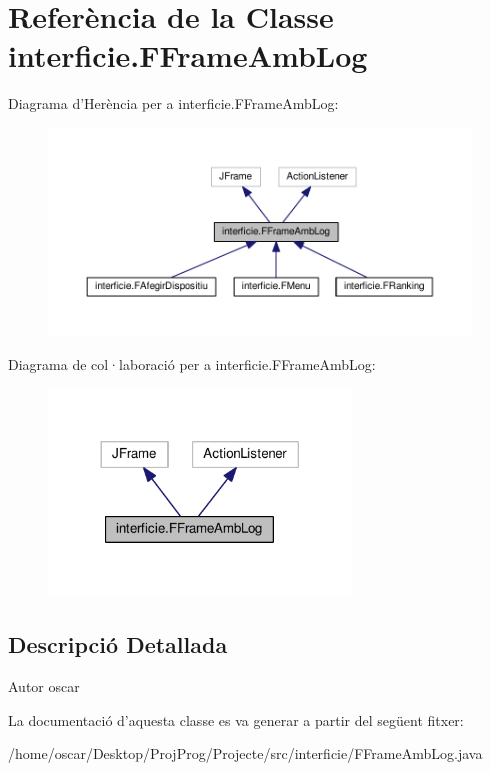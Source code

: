 \hypertarget{classinterficie_1_1_f_frame_amb_log}{\section{Referència de la Classe interficie.\+F\+Frame\+Amb\+Log}
\label{classinterficie_1_1_f_frame_amb_log}
}


Diagrama d'Herència per a interficie.\+F\+Frame\+Amb\+Log\+:\nopagebreak
\begin{figure}[H]
\begin{center}
\leavevmode
\includegraphics[width=350pt]{classinterficie_1_1_f_frame_amb_log__inherit__graph}
\end{center}
\end{figure}


Diagrama de col·laboració per a interficie.\+F\+Frame\+Amb\+Log\+:\nopagebreak
\begin{figure}[H]
\begin{center}
\leavevmode
\includegraphics[width=228pt]{classinterficie_1_1_f_frame_amb_log__coll__graph}
\end{center}
\end{figure}


\subsection{Descripció Detallada}
\begin{DoxyAuthor}{Autor}
oscar 
\end{DoxyAuthor}


La documentació d'aquesta classe es va generar a partir del següent fitxer\+:\begin{DoxyCompactItemize}
\item 
/home/oscar/\+Desktop/\+Proj\+Prog/\+Projecte/src/interficie/F\+Frame\+Amb\+Log.\+java\end{DoxyCompactItemize}
